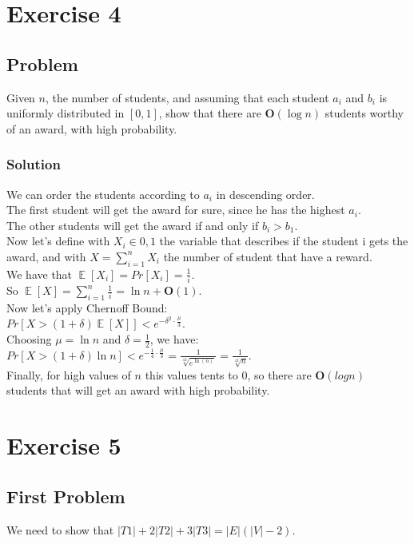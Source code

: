 \documentclass[11pt]{article}
\begin{document}
\newpage

\section*{Exercise 4}
\subsection*{Problem}
Given $n$, the number of students, and assuming that each student $a_i$ and $b_i$
is
uniformly distributed in $[0, 1]$, show that there are $\mathbf{O}(\log n)$ students worthy of an award, with
high probability.
\subsubsection*{Solution}
We can order the students according to $a_i$ in descending order. \\
The first student will get the award for sure, since he has the highest $a_i$. \\
The other students will get the award if and only if $b_i > b_1$. \\
Now let's define with $X_i \in {0, 1}$ the variable that describes if the student i gets the award, and with $X = \sum\limits_{i = 1}^n X_i$ the number of student that have a reward. \\
We have that $\mathop{\mathbb{E}}[X_i] = Pr[X_i] = \frac{1}{i}$. \\
So $\mathop{\mathbb{E}}[X] = \sum\limits_{i = 1}^n \frac{1}{i} = \ln n + \mathbf{O}(1)$. \\
Now let's apply Chernoff Bound: \\
$Pr[X > (1 + \delta)\mathop{\mathbb{E}}[X]] < e^{-\delta^2 \cdot \frac{\mu}{3}}$. \\
Choosing $\mu = \ln n$ and $\delta = \frac{1}{2}$, we have: \\
$Pr[X > (1 + \delta)\ln n] < e^{-\frac{1}{4} \cdot \frac{\mu}{3}} = \frac{1}{\sqrt[12]{e^{\ln(n)}}} = \frac{1}{\sqrt[12]{n}}$. \\
Finally, for high values of $n$ this values tents to 0, so there are $\mathbf{O}(log n)$ students that will get an award with high probability.
 
\newpage

\section*{Exercise 5}
\subsection*{First Problem}
We need to show that $|T1| + 2|T2| + 3|T3| = |E|(|V | − 2)$.
\end{document}
